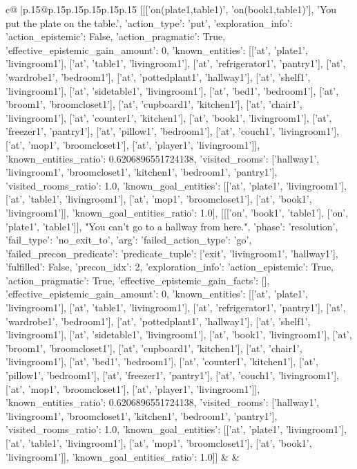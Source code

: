 \documentclass{article}
\begin{document}
{\begin{supertabular}{c@{$\;$}|p{.15\linewidth}@{}p{.15\linewidth}p{.15\linewidth}p{.15\linewidth}p{.15\linewidth}p{.15\linewidth}}
{{{	 [[['on(plate1,table1)', 'on(book1,table1)'], 'You put the plate on the table.', {'action_type': 'put', 'exploration_info': {'action_epistemic': False, 'action_pragmatic': True, 'effective_epistemic_gain_amount': 0, 'known_entities': [['at', 'plate1', 'livingroom1'], ['at', 'table1', 'livingroom1'], ['at', 'refrigerator1', 'pantry1'], ['at', 'wardrobe1', 'bedroom1'], ['at', 'pottedplant1', 'hallway1'], ['at', 'shelf1', 'livingroom1'], ['at', 'sidetable1', 'livingroom1'], ['at', 'bed1', 'bedroom1'], ['at', 'broom1', 'broomcloset1'], ['at', 'cupboard1', 'kitchen1'], ['at', 'chair1', 'livingroom1'], ['at', 'counter1', 'kitchen1'], ['at', 'book1', 'livingroom1'], ['at', 'freezer1', 'pantry1'], ['at', 'pillow1', 'bedroom1'], ['at', 'couch1', 'livingroom1'], ['at', 'mop1', 'broomcloset1'], ['at', 'player1', 'livingroom1']], 'known_entities_ratio': 0.6206896551724138, 'visited_rooms': ['hallway1', 'livingroom1', 'broomcloset1', 'kitchen1', 'bedroom1', 'pantry1'], 'visited_rooms_ratio': 1.0, 'known_goal_entities': [['at', 'plate1', 'livingroom1'], ['at', 'table1', 'livingroom1'], ['at', 'mop1', 'broomcloset1'], ['at', 'book1', 'livingroom1']], 'known_goal_entities_ratio': 1.0}}], [[['on', 'book1', 'table1'], ['on', 'plate1', 'table1']], "You can't go to a hallway from here.", {'phase': 'resolution', 'fail_type': 'no_exit_to', 'arg': {'failed_action_type': 'go', 'failed_precon_predicate': {'predicate_tuple': ['exit', 'livingroom1', 'hallway1'], 'fulfilled': False, 'precon_idx': 2}}, 'exploration_info': {'action_epistemic': True, 'action_pragmatic': True, 'effective_epistemic_gain_facts': [], 'effective_epistemic_gain_amount': 0, 'known_entities': [['at', 'plate1', 'livingroom1'], ['at', 'table1', 'livingroom1'], ['at', 'refrigerator1', 'pantry1'], ['at', 'wardrobe1', 'bedroom1'], ['at', 'pottedplant1', 'hallway1'], ['at', 'shelf1', 'livingroom1'], ['at', 'sidetable1', 'livingroom1'], ['at', 'book1', 'livingroom1'], ['at', 'broom1', 'broomcloset1'], ['at', 'cupboard1', 'kitchen1'], ['at', 'chair1', 'livingroom1'], ['at', 'bed1', 'bedroom1'], ['at', 'counter1', 'kitchen1'], ['at', 'pillow1', 'bedroom1'], ['at', 'freezer1', 'pantry1'], ['at', 'couch1', 'livingroom1'], ['at', 'mop1', 'broomcloset1'], ['at', 'player1', 'livingroom1']], 'known_entities_ratio': 0.6206896551724138, 'visited_rooms': ['hallway1', 'livingroom1', 'broomcloset1', 'kitchen1', 'bedroom1', 'pantry1'], 'visited_rooms_ratio': 1.0, 'known_goal_entities': [['at', 'plate1', 'livingroom1'], ['at', 'table1', 'livingroom1'], ['at', 'mop1', 'broomcloset1'], ['at', 'book1', 'livingroom1']], 'known_goal_entities_ratio': 1.0}}]] 
	  } 
	   } 
	   } 
	 & & \\ 
 


\end{supertabular}}
\end{document}
